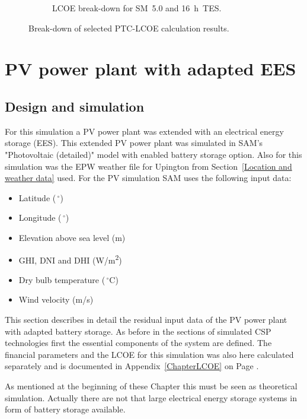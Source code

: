 \begin{figure}[!htbp]
\begin{subfigure}[b]{0.5\textwidth}
                \caption{LCOE break-down for SM~5.0 and 16~h~TES.}\label{PTC_LCOE_highinvest_BreakDown}
        \end{subfigure}
        \caption[Break-down of selected PTC-LCOE calculation results.]{Break-down of selected PTC-LCOE calculation results.}\label{PTC_LCOE_BreakDown}
\end{figure}
\pagebreak
\section{PV power plant with adapted EES}
\subsection{Design and simulation} \label{section PV system}
For this simulation a PV power plant was extended with an electrical energy storage (EES). This extended PV power plant was simulated in SAM's "Photovoltaic (detailed)" model with enabled battery storage option. Also for this simulation was the EPW weather file for Upington from Section~\ref{Location and weather data} used. For the PV simulation SAM uses the following input data:
\begin{itemize}
\item Latitude ($\,^{\circ}$)
\item Longitude ($\,^{\circ}$)
\item Elevation above sea level (m)
\item GHI, DNI and DHI (W/m\textsuperscript{2})
\item Dry bulb temperature ($\,^{\circ}\mathrm{C}$)
\item Wind velocity (m/s)
\end{itemize}
This section describes in detail the residual input data of the PV power plant with adapted battery storage. As before in the sections of simulated CSP technologies first the essential components of the system are defined. The financial parameters and the LCOE for this simulation was also here calculated separately and is documented in Appendix~\ref{ChapterLCOE} on Page \pageref{ChapterLCOE}.



As mentioned at the beginning of these Chapter this must be seen as theoretical simulation. Actually there are not that large electrical energy storage systems in form of battery storage available.



